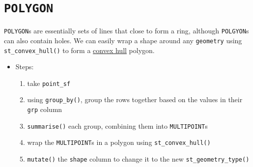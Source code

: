 \documentclass[
]{report}
\providecommand{\tightlist}{%
  \setlength{\itemsep}{0pt}\setlength{\parskip}{0pt}}
\begin{document}
\hypertarget{polygon}{%
\section{\texorpdfstring{\texttt{POLYGON}}{POLYGON}}\label{polygon}}

\texttt{POLYGON}s are essentially sets of lines that close to form a ring, although \texttt{POLGYON}s can also contain holes. We can easily wrap a shape around any \texttt{geometry} using \texttt{st\_convex\_hull()} to form a \href{https://en.wikipedia.org/wiki/Convex_hull}{convex hull} polygon.

\begin{itemize}
\tightlist
\item
  Steps:

  \begin{enumerate}
  \def\labelenumi{\arabic{enumi}.}
  \tightlist
  \item
    take \texttt{point\_sf}
  \item
    using \texttt{group\_by()}, group the rows together based on the values in their \texttt{grp} column
  \item
    \texttt{summarise()} each group, combining them into \texttt{MULTIPOINT}s
  \item
    wrap the \texttt{MULTIPOINT}s in a polygon using \texttt{st\_convex\_hull()}
  \item
    \texttt{mutate()} the \texttt{shape} column to change it to the new \texttt{st\_geometry\_type()}
  \end{enumerate}
\end{itemize}
\end{document}
